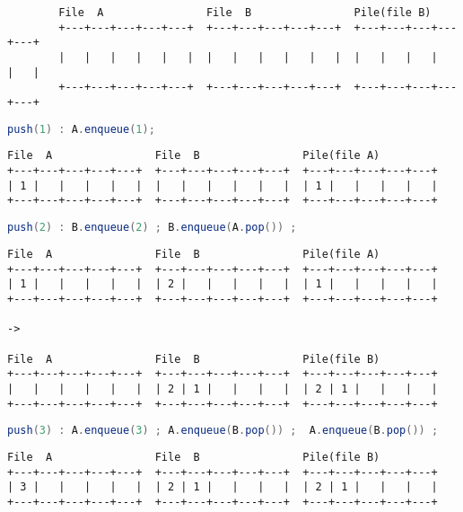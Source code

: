 \documentclass[a4paper]{article}
\begin{document}
\begin{enumerate}
\begin{verbatim}
		File  A                File  B                Pile(file B)
		+---+---+---+---+---+  +---+---+---+---+---+  +---+---+---+---+---+
		|   |   |   |   |   |  |   |   |   |   |   |  |   |   |   |   |   |
		+---+---+---+---+---+  +---+---+---+---+---+  +---+---+---+---+---+
\end{verbatim}
		
\begin{lstlisting}[language=Java]
push(1) : A.enqueue(1);
\end{lstlisting}
		
\begin{verbatim}
File  A                File  B                Pile(file A)
+---+---+---+---+---+  +---+---+---+---+---+  +---+---+---+---+---+
| 1 |   |   |   |   |  |   |   |   |   |   |  | 1 |   |   |   |   |
+---+---+---+---+---+  +---+---+---+---+---+  +---+---+---+---+---+
\end{verbatim}
				
\begin{lstlisting}[language=Java]
push(2) : B.enqueue(2) ; B.enqueue(A.pop()) ;
\end{lstlisting}

\begin{verbatim}
File  A                File  B                Pile(file A)
+---+---+---+---+---+  +---+---+---+---+---+  +---+---+---+---+---+
| 1 |   |   |   |   |  | 2 |   |   |   |   |  | 1 |   |   |   |   |
+---+---+---+---+---+  +---+---+---+---+---+  +---+---+---+---+---+

-> 

File  A                File  B                Pile(file B)
+---+---+---+---+---+  +---+---+---+---+---+  +---+---+---+---+---+
|   |   |   |   |   |  | 2 | 1 |   |   |   |  | 2 | 1 |   |   |   |
+---+---+---+---+---+  +---+---+---+---+---+  +---+---+---+---+---+
\end{verbatim}
				
\begin{lstlisting}[language=Java]
push(3) : A.enqueue(3) ; A.enqueue(B.pop()) ;  A.enqueue(B.pop()) ;
\end{lstlisting}	

\begin{verbatim}
File  A                File  B                Pile(file B)
+---+---+---+---+---+  +---+---+---+---+---+  +---+---+---+---+---+
| 3 |   |   |   |   |  | 2 | 1 |   |   |   |  | 2 | 1 |   |   |   |
+---+---+---+---+---+  +---+---+---+---+---+  +---+---+---+---+---+


\end{verbatim}
\end{enumerate}
\end{document}

